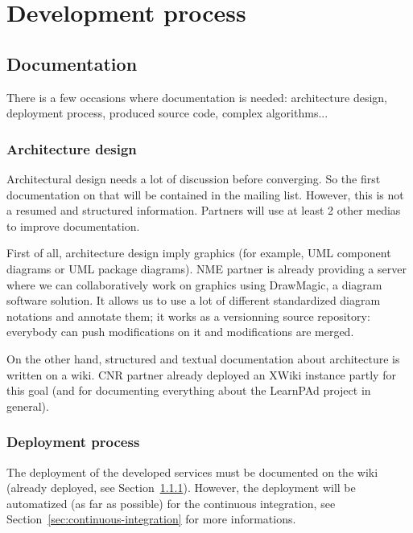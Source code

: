 \chapter{Development process}
\label{ch:development-process}

\section{Documentation}
\label{sec:documentation}

There is a few occasions where documentation is needed: architecture design, deployment process, produced source code, complex algorithms...

\subsection{Architecture design}
\label{sec:architecture-design}

Architectural design needs a lot of discussion before converging.  So the first documentation on that will be contained in the mailing list.  However, this is not a resumed and structured information.  Partners will use at least 2 other medias to improve documentation.

First of all, architecture design imply graphics (for example, UML component diagrams or UML package diagrams).  NME partner is already providing a server where we can collaboratively work on graphics using DrawMagic, a diagram software solution.  It allows us to use a lot of different standardized diagram notations and annotate them; it works as a versionning source repository: everybody can push modifications on it and modifications are merged.

On the other hand, structured and textual documentation about architecture is written on a wiki.  CNR partner already deployed an XWiki instance partly for this goal (and for documenting everything about the LearnPAd project in general).

\subsection{Deployment process}
\label{sec:deployment-process}

The deployment of the developed services must be documented on the wiki (already deployed, see Section~\ref{sec:architecture-design}).  However, the deployment will be automatized (as far as possible) for the continuous integration, see Section~\ref{sec:continuous-integration} for more informations.

